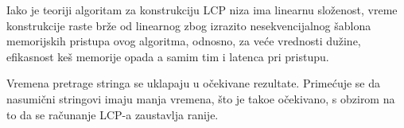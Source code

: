 Iako je teoriji algoritam za konstrukciju LCP niza ima linearnu slo\v zenost, vreme konstrukcije raste br\v ze od linearnog zbog izrazito nesekvencijalnog \v sablona memorijskih pristupa ovog algoritma, odnosno, za ve\' ce vrednosti du\v zine, efikasnost ke\v s memorije opada a samim tim i latenca pri pristupu.

Vremena pretrage stringa se uklapaju u o\v cekivane rezultate. Prime\' cuje se da nasumi\v cni stringovi imaju manja vremena, \v sto je tako\dj e o\v cekivano, s obzirom na to da se ra\v cunanje LCP-a zaustavlja ranije.